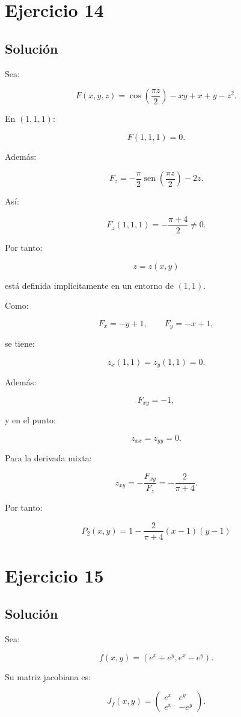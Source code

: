 \documentclass[11pt,a4paper]{article}
\newcommand{\sen}{\operatorname{sen}}
\begin{document}
\section{Ejercicio 14}
\subsection{Solución}

Sea:

\[
F(x,y,z)
=
\cos\left(\frac{\pi z}{2}\right)
-xy+x+y-z^2.
\]

En \((1,1,1)\):

\[
F(1,1,1)=0.
\]

Además:

\[
F_z
=
-\frac{\pi}{2}
\sen\left(
\frac{\pi z}{2}
\right)
-2z.
\]

Así:

\[
F_z(1,1,1)
=
-\frac{\pi+4}{2}\neq0.
\]

Por tanto:

\[
z=z(x,y)
\]

está definida implícitamente en un entorno de \((1,1)\).

Como:

\[
F_x=-y+1,
\qquad
F_y=-x+1,
\]

se tiene:

\[
z_x(1,1)=z_y(1,1)=0.
\]

Además:

\[
F_{xy}=-1,
\]

y en el punto:

\[
z_{xx}=z_{yy}=0.
\]

Para la derivada mixta:

\[
z_{xy}
=
-\frac{F_{xy}}{F_z}
=
-\frac{2}{\pi+4}.
\]

Por tanto:

\[
\boxed{
P_2(x,y)
=
1
-
\frac{2}{\pi+4}
(x-1)(y-1)
}
\]

\section{Ejercicio 15}
\subsection{Solución}

Sea:

\[
f(x,y)
=
\left(
e^x+e^y,
e^x-e^y
\right).
\]

Su matriz jacobiana es:

\[
J_f(x,y)
=
\begin{pmatrix}
e^x&e^y\\
e^x&-e^y
\end{pmatrix}.
\]
\end{document}
